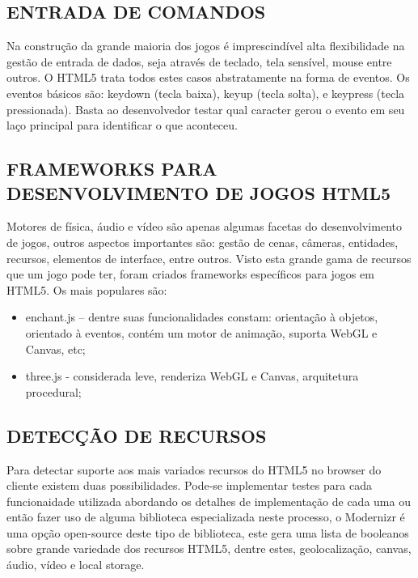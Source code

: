 \documentclass{article}
\begin{document}
\subsection{ENTRADA DE COMANDOS}


	Na construção da grande maioria dos jogos é imprescindível alta flexibilidade na gestão de entrada de dados, seja através de teclado, tela sensível, mouse entre outros. O HTML5 trata todos estes casos abstratamente na forma de eventos. Os eventos básicos são: keydown (tecla baixa), keyup (tecla solta), e keypress (tecla pressionada). Basta ao desenvolvedor testar qual caracter gerou o evento em seu laço principal para identificar o que aconteceu.


\subsection{FRAMEWORKS PARA DESENVOLVIMENTO DE JOGOS HTML5} 

Motores de física, áudio e vídeo são apenas algumas facetas do desenvolvimento de jogos, outros aspectos importantes são: gestão de cenas, câmeras, entidades, recursos, elementos de interface, entre outros. Visto esta grande gama de recursos que um jogo pode ter, foram criados frameworks específicos para jogos em HTML5. 
Os mais populares são:

\begin{itemize}
    \item enchant.js – dentre suas funcionalidades constam: orientação à objetos, orientado à eventos, contém um motor de animação, suporta WebGL e Canvas, etc;

    \item three.js  - considerada leve, renderiza WebGL e Canvas, arquitetura procedural;
\end{itemize}

\subsection{DETECÇÃO DE RECURSOS}

	Para detectar suporte aos mais variados recursos do HTML5 no browser do cliente existem duas possibilidades. Pode-se implementar testes para cada funcionaidade utilizada abordando os detalhes de implementação de cada uma ou então fazer uso de alguma biblioteca especializada neste processo, o Modernizr é uma opção open-source deste tipo de biblioteca, este gera uma lista de booleanos sobre grande variedade dos recursos HTML5, dentre estes, geolocalização, canvas, áudio, vídeo e local storage.  
\end{document}
